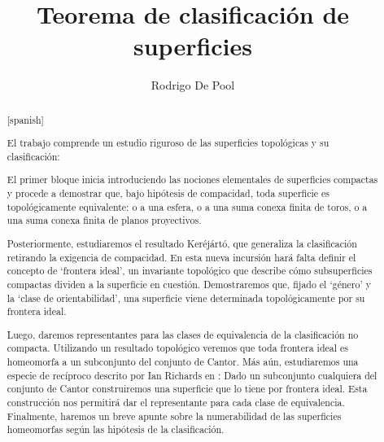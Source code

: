 \documentclass[a4paper,11pt,spanish, twoside, leqno]{tfg-uam}
\title{Teorema de clasificación de superficies}
\author{Rodrigo De Pool}
\theoremstyle{definition}
\begin{document}
\begin{abstract}[spanish]

El trabajo comprende un estudio riguroso de las superficies topológicas y su clasificación:

El primer bloque inicia introduciendo las nociones elementales de superficies compactas y procede a demostrar que, bajo hipótesis de compacidad, toda superficie es topológicamente equivalente: o a una esfera, o a una suma conexa finita de toros, o a una suma conexa finita de planos proyectivos. 

Posteriormente, estudiaremos el resultado Keréjártó, que generaliza la clasificación retirando la exigencia de compacidad. En esta nueva incursión hará falta definir el concepto de `frontera ideal', un invariante topológico que describe cómo subsuperficies compactas dividen a la superficie en cuestión. Demostraremos que, fijado el `género' y la `clase de orientabilidad', una superficie viene determinada topológicamente por su frontera ideal. 

Luego, daremos representantes para las clases de equivalencia de la clasificación no compacta. Utilizando un resultado topológico veremos que toda frontera ideal es homeomorfa a un subconjunto del conjunto de Cantor. Más aún, estudiaremos una especie de recíproco descrito por Ian Richards en \cite{ian}: Dado un subconjunto cualquiera del conjunto de Cantor construiremos una superficie que lo tiene por frontera ideal. Esta construcción nos permitirá dar el representante para cada clase de equivalencia. Finalmente, haremos un breve apunte sobre la numerabilidad de las superficies homeomorfas según las hipótesis de la clasificación.
\end{abstract}
\end{document}
